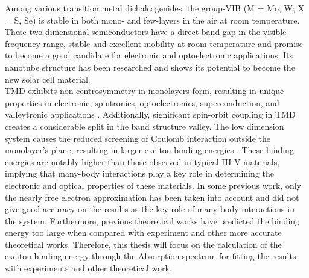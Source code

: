 \documentclass[12pt,english,a4paper]{article}
\begin{document}
	Among various transition metal dichalcogenides, the group-VIB (M = Mo, W; X = S, Se) is stable in both mono- and few-layers in the air at room temperature.\cite{geim_van_2013} These two-dimensional semiconductors have a direct band gap in the visible frequency range, stable and excellent mobility at room temperature\cite{jiang_flexo-photovoltaic_2021, wang_electronics_2012} and promise to become a good candidate for electronic and optoelectronic applications. Its nanotube structure has been researched and shows its potential to become the new solar cell material\cite{kim_giant_2022,zhang_enhanced_2019,jiang_flexo-photovoltaic_2021,yang_spontaneous-polarization-induced_2022}. \\\null
	\quad TMD exhibits non-centrosymmetry in monolayers form, resulting in unique properties in electronic, spintronics, optoelectronics, superconduction, and valleytronic applications \cite{xiao_valley-contrasting_2007,yao_valley-dependent_2008}. Additionally, significant spin-orbit coupling in TMD creates a considerable split in the band structure valley. The low dimension system causes the reduced screening of Coulomb interaction outside the monolayer's plane, resulting in larger exciton binding energies \cite{kirichenko_influence_2021, zhang_absorption_2014}. These binding energies are notably higher than those observed in typical III-V materials, implying that many-body interactions play a key role in determining the electronic and optical properties of these materials. In some previous work, only the nearly free electron approximation has been taken into account and did not give good accuracy on the results as the key role of many-body interactions in the system. Furthermore, previous theoretical works have predicted the binding energy too large\cite{ramasubramaniam_large_2012,qiu_optical_2013,cheiwchanchamnangij_quasiparticle_2012, shi_quasiparticle_2013} when compared with experiment\cite{zhang_absorption_2014} and other more accurate theoretical works\cite{zhang_absorption_2014, kirichenko_influence_2021}. Therefore, this thesis will focus on the calculation of the exciton binding energy through the Absorption spectrum for fitting the results with experiments and other theoretical work.
\end{document}
